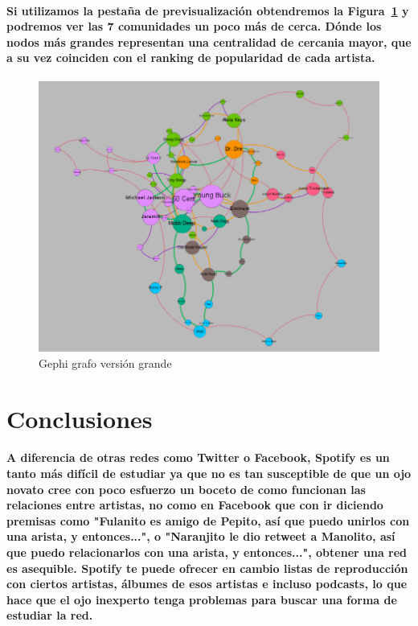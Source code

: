 \documentclass[11pt,spanish]{article}
\begin{document}
\paragraph*{Si utilizamos la pestaña de previsualización obtendremos la Figura~\ref{fig:gephi_bonito} y podremos ver las 7 comunidades un poco más de cerca. 
Dónde los nodos más grandes representan una centralidad de cercania mayor, que a su vez coinciden con el ranking de popularidad de cada artista.}

\begin{figure}[h!]
    \centering
    \includegraphics[width=150mm]{gephi_grafo_bonito.png}
    \caption{Gephi grafo versión grande}\label{fig:gephi_bonito}
\end{figure}
\pagebreak

\section{Conclusiones}

\paragraph*{A diferencia de otras redes como Twitter o Facebook, Spotify es un tanto más difícil de estudiar ya que no es tan susceptible de que un ojo novato cree con poco esfuerzo un boceto de como funcionan las relaciones entre artistas, 
no como en Facebook que con ir diciendo premisas como "Fulanito es amigo de Pepito, así que puedo unirlos con una arista, y entonces...", o "Naranjito le dio retweet a Manolito, así que puedo relacionarlos con una arista, y entonces...", obtener una red es asequible. Spotify te puede ofrecer en cambio listas de reproducción con ciertos artistas, álbumes de esos artistas e incluso podcasts, lo que hace que el ojo inexperto tenga problemas para buscar una forma de estudiar la red. }
\end{document}
